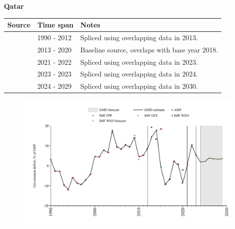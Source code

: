 \documentclass[12pt,a4paper,landscape]{article}
\begin{document}
\begin{adjustbox}{max totalsize={\paperwidth}{\paperheight},center}
\begin{minipage}[t][\textheight][t]{\textwidth}
\vspace*{0.5cm}
{}
\begin{center}
{\Large\bfseries Qatar}
\end{center}
\vspace{0.5cm}
\begin{table}[H]
\centering
\small
\begin{tabular}{|l|l|l|}
\hline
\textbf{Source} & \textbf{Time span} & \textbf{Notes} \\
\hline
\rowcolor{white}\cite{IMF_WEO}& 1990 - 2012 &Spliced using overlapping data in 2013.\\
\rowcolor{lightgray}\cite{AMF}& 2013 - 2020 &Baseline source, overlaps with base year 2018.\\
\rowcolor{white}\cite{IMF_WEO}& 2021 - 2022 &Spliced using overlapping data in 2023.\\
\rowcolor{lightgray}\cite{IMF_FPP}& 2023 - 2023 &Spliced using overlapping data in 2024.\\
\rowcolor{white}\cite{IMF_WEO_forecast}& 2024 - 2029 &Spliced using overlapping data in 2030.\\
\hline
\end{tabular}
\end{table}
\begin{figure}[H]
\centering
\includegraphics[width=\textwidth,height=0.6\textheight,keepaspectratio]{graphs/QAT_govdef_GDP.pdf}
\end{figure}
\end{minipage}
\end{adjustbox}
\end{document}
